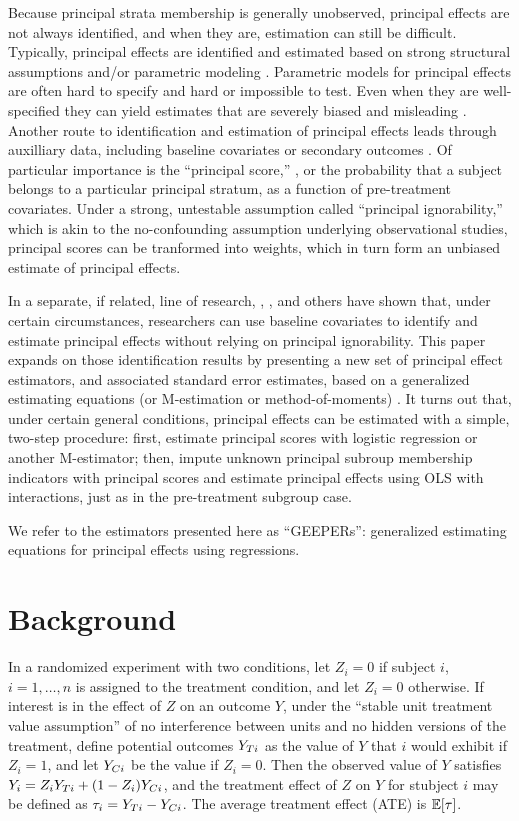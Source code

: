 \documentclass[11pt]{article} %
\begin{document}
Because principal strata membership is generally unobserved, principal effects are not always identified, and when they are, estimation can still be difficult.
Typically, principal effects are identified and estimated based on strong structural assumptions \citep[e.g.][]{air} and/or parametric modeling \citep[e.g.][]{imbensRubin98}.
Parametric models for principal effects are often hard to specify and hard or impossible to test.
Even when they are well-specified they can yield estimates that are severely biased and misleading \citep{griffin,feller}.
Another route to identification and estimation of principal effects leads through auxilliary data, including baseline covariates \citep{} or secondary outcomes \citep{mealli}.
Of particular importance is the ``principal score,'' \citep{jo,ding,feller}, or the probability that a subject belongs to a particular principal stratum, as a function of pre-treatment covariates.
Under a strong, untestable assumption called ``principal ignorability,'' which is akin to the no-confounding assumption underlying observational studies, principal scores can be tranformed into weights, which in turn form an unbiased estimate of principal effects.

In a separate, if related, line of research, \citet{ding2011}, \citet{jiangDing2021}, and others have shown that, under certain circumstances, researchers can use baseline covariates to identify and estimate principal effects without relying on principal ignorability.
This paper expands on those identification results by presenting a new set of principal effect estimators, and associated standard error estimates, based on a generalized estimating equations (or M-estimation or method-of-moments) \citep{stefanskiBoos}.
It turns out that, under certain general conditions, principal effects can be estimated with a simple, two-step procedure: first, estimate principal scores with logistic regression or another M-estimator; then, impute unknown principal subroup membership indicators with principal scores and estimate principal effects using OLS with interactions, just as in the pre-treatment subgroup case.


We refer to the estimators presented here as ``GEEPERs'': generalized estimating equations for principal effects using regressions.


\section{Background}
In a randomized experiment with two conditions, let $Z_i=0$ if subject $i$, $i=1,\dots,n$ is assigned to the treatment condition, and let $Z_i=0$ otherwise.
If interest is in the effect of $Z$ on an outcome $Y$, under the ``stable unit treatment value assumption'' \citep{sutva} of no interference between units and no hidden versions of the treatment, define potential outcomes \citep{neyman,rubin} $Y_{Ti}$ as the value of $Y$ that $i$ would exhibit if $Z_i=1$, and let $Y_{Ci}$ be the value if $Z_i=0$. Then the observed value of $Y$ satisfies $Y_i=Z_iY_{Ti}+(1-Z_i)Y_{Ci}$, and the treatment effect of $Z$ on $Y$ for stubject $i$ may be defined as $\tau_i=Y_{Ti}-Y_{Ci}$. The average treatment effect (ATE) is $\mathbb{E}[\tau]$. %
\end{document}
